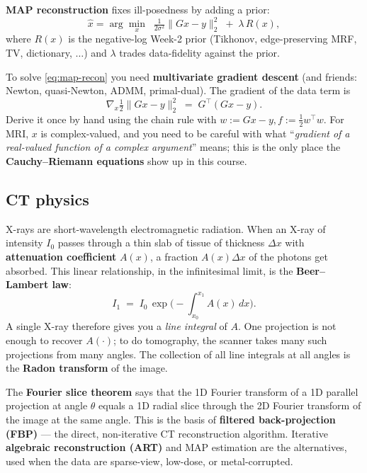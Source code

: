 \documentclass[11pt,a4paper]{article}
\begin{document}
\textbf{MAP reconstruction} fixes ill-posedness by adding a prior:
\begin{equation}
  \hat x = \arg\min_x \;\;\tfrac{1}{2\sigma^2}\|Gx - y\|_2^2 \;+\; \lambda \, R(x),
  \label{eq:map-recon}
\end{equation}
where $R(x)$ is the negative-log Week-2 prior (Tikhonov,
edge-preserving MRF, TV, dictionary, $\ldots$) and $\lambda$
trades data-fidelity against the prior.

To solve \eqref{eq:map-recon} you need
\textbf{multivariate gradient descent} (and friends: Newton,
quasi-Newton, ADMM, primal-dual). The gradient of the data term is
\begin{equation}
  \nabla_x \tfrac{1}{2}\|Gx - y\|_2^2 \;=\; G^\top (Gx - y).
\end{equation}
Derive it once by hand using the chain rule with
$w := Gx - y, f := \tfrac12 w^\top w$. For MRI, $x$ is
complex-valued, and you need to be careful with what
``\emph{gradient of a real-valued function of a complex argument}''
means; this is the only place the
\textbf{Cauchy--Riemann equations} show up in this course.

\subsection{CT physics}

X-rays are short-wavelength electromagnetic radiation. When an X-ray
of intensity $I_0$ passes through a thin slab of tissue of thickness
$\Delta x$ with \textbf{attenuation coefficient} $A(x)$, a fraction
$A(x)\Delta x$ of the photons get absorbed. This linear relationship,
in the infinitesimal limit, is the
\textbf{Beer--Lambert law}:
\begin{equation}
  I_1 \;=\; I_0 \,\exp\!\Big(-\!\int_{x_0}^{x_1} A(x)\,dx\Big).
  \label{eq:beer}
\end{equation}
A single X-ray therefore gives you a \emph{line integral} of $A$. One
projection is not enough to recover $A(\cdot)$; to do tomography,
the scanner takes many such projections from many angles. The
collection of all line integrals at all angles is the
\textbf{Radon transform} of the image.

The \textbf{Fourier slice theorem} says that the 1D Fourier transform
of a 1D parallel projection at angle $\theta$ equals a 1D radial
slice through the 2D Fourier transform of the image at the same
angle. This is the basis of \textbf{filtered back-projection (FBP)} ---
the direct, non-iterative CT reconstruction algorithm. Iterative
\textbf{algebraic reconstruction (ART)} and MAP estimation are the
alternatives, used when the data are sparse-view, low-dose, or
metal-corrupted.
\end{document}
